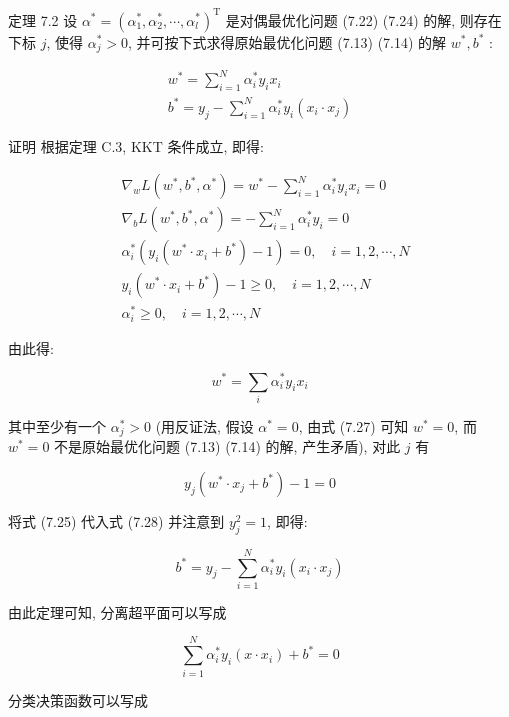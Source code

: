 \documentclass[10pt]{article}
\begin{document}
定理 7.2 设 $\alpha^{*}=\left(\alpha_{1}^{*}, \alpha_{2}^{*}, \cdots, \alpha_{l}^{*}\right)^{\mathrm{T}}$ 是对偶最优化问题 (7.22) (7.24) 的解, 则存在下标 $j$, 使得 $\alpha_{j}^{*}>0$, 并可按下式求得原始最优化问题 (7.13) (7.14) 的解 $w^{*}, b^{*}$ :


\begin{gather*}
w^{*}=\sum_{i=1}^{N} \alpha_{i}^{*} y_{i} x_{i}  \tag{7.25}\\
b^{*}=y_{j}-\sum_{i=1}^{N} \alpha_{i}^{*} y_{i}\left(x_{i} \cdot x_{j}\right) \tag{7.26}
\end{gather*}


证明 根据定理 C.3, KKT 条件成立, 即得:


\begin{align*}
& \nabla_{w} L\left(w^{*}, b^{*}, \alpha^{*}\right)=w^{*}-\sum_{i=1}^{N} \alpha_{i}^{*} y_{i} x_{i}=0  \tag{7.27}\\
& \nabla_{b} L\left(w^{*}, b^{*}, \alpha^{*}\right)=-\sum_{i=1}^{N} \alpha_{i}^{*} y_{i}=0 \\
& \alpha_{i}^{*}\left(y_{i}\left(w^{*} \cdot x_{i}+b^{*}\right)-1\right)=0, \quad i=1,2, \cdots, N \\
& y_{i}\left(w^{*} \cdot x_{i}+b^{*}\right)-1 \geqslant 0, \quad i=1,2, \cdots, N \\
& \alpha_{i}^{*} \geqslant 0, \quad i=1,2, \cdots, N
\end{align*}


由此得:

$$
w^{*}=\sum_{i} \alpha_{i}^{*} y_{i} x_{i}
$$

其中至少有一个 $\alpha_{j}^{*}>0$ (用反证法, 假设 $\alpha^{*}=0$, 由式 (7.27) 可知 $w^{*}=0$, 而 $w^{*}=0$ 不是原始最优化问题 (7.13) (7.14) 的解, 产生矛盾), 对此 $j$ 有


\begin{equation*}
y_{j}\left(w^{*} \cdot x_{j}+b^{*}\right)-1=0 \tag{7.28}
\end{equation*}


将式 (7.25) 代入式 (7.28) 并注意到 $y_{j}^{2}=1$, 即得:

$$
b^{*}=y_{j}-\sum_{i=1}^{N} \alpha_{i}^{*} y_{i}\left(x_{i} \cdot x_{j}\right)
$$

由此定理可知, 分离超平面可以写成


\begin{equation*}
\sum_{i=1}^{N} \alpha_{i}^{*} y_{i}\left(x \cdot x_{i}\right)+b^{*}=0 \tag{7.29}
\end{equation*}


分类决策函数可以写成
\end{document}
